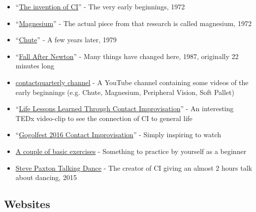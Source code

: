 \begin{itemize}
    \setlength\itemsep{0em}
    \item ``\href{https://www.youtube.com/watch?v=9FeSDsmIeHA}{The invention of CI}'' - The very early beginnings, 1972
    \item ``\href{https://www.youtube.com/watch?v=5gEfVJBhwrQ}{Magnesium}'' - The actual piece from that research is called magnesium, 1972
    \item ``\href{https://www.youtube.com/watch?v=xKlO-2e3gHo}{Chute}'' - A few years later, 1979
    \item ``\href{https://www.youtube.com/watch?v=k768K\_OTePM}{Fall After Newton}'' - Many things have changed here, 1987, originally 22 minutes long
    \item \href{https://www.youtube.com/@contactquarterly}{contactquarterly channel} - A YouTube channel containing some videos of the early beginnings (e.g. Chute, Magnesium, Peripheral Vision, Soft Pallet)
    \item ``\href{https://www.youtube.com/watch?v=hlIRjfto7o0}{Life Lessons Learned Through Contact Improvisation}'' - An interesting TEDx video-clip to see the connection of CI to general life
    \item ``\href{https://www.youtube.com/watch?v=n1D9RU2GbBo}{Gogolfest 2016 Contact Improvisation}'' - Simply inspiring to watch
    \item \href{https://www.youtube.com/watch?v=H8JiB2Nv5Qo}{A couple of basic exercises} - Something to practice by yourself as a beginner
    \item \href{https://www.youtube.com/watch?v=_82Od5NM4LI}{Steve Paxton Talking Dance} - The creator of CI giving an almost 2 hours talk about dancing, 2015
\end{itemize}

\subsection{Websites}\label{subsec:websites}

